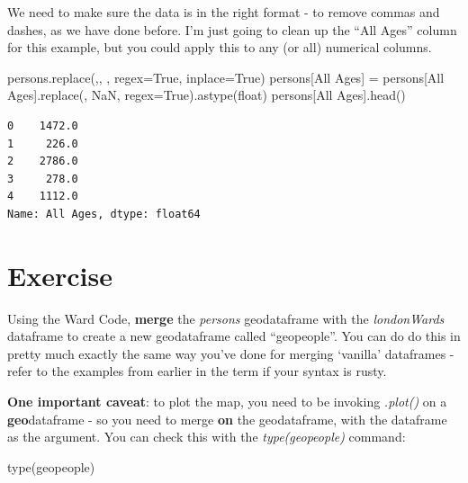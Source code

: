 \documentclass[
  letterpaper,
  DIV=11,
  numbers=noendperiod]{scrreprt}
\newenvironment{Shaded}{\begin{snugshade}}{\end{snugshade}}
\newcommand{\BuiltInTok}[1]{\textcolor[rgb]{0.00,0.23,0.31}{#1}}
\newcommand{\NormalTok}[1]{\textcolor[rgb]{0.00,0.23,0.31}{#1}}
\newcommand{\OperatorTok}[1]{\textcolor[rgb]{0.37,0.37,0.37}{#1}}
\newcommand{\StringTok}[1]{\textcolor[rgb]{0.13,0.47,0.30}{#1}}
\newcommand{\VariableTok}[1]{\textcolor[rgb]{0.07,0.07,0.07}{#1}}
\begin{document}
We need to make sure the data is in the right format - to remove commas
and dashes, as we have done before. I'm just going to clean up the ``All
Ages'' column for this example, but you could apply this to any (or all)
numerical columns.

\begin{Shaded}
\begin{Highlighting}[]
\NormalTok{persons.replace(}\StringTok{\textquotesingle{},\textquotesingle{}}\NormalTok{, }\StringTok{\textquotesingle{}\textquotesingle{}}\NormalTok{, regex}\OperatorTok{=}\VariableTok{True}\NormalTok{, inplace}\OperatorTok{=}\VariableTok{True}\NormalTok{)}
\NormalTok{persons[}\StringTok{\textquotesingle{}All Ages\textquotesingle{}}\NormalTok{] }\OperatorTok{=}\NormalTok{ persons[}\StringTok{\textquotesingle{}All Ages\textquotesingle{}}\NormalTok{].replace(}\StringTok{\textquotesingle{}{-}\textquotesingle{}}\NormalTok{, }\StringTok{\textquotesingle{}NaN\textquotesingle{}}\NormalTok{, regex}\OperatorTok{=}\VariableTok{True}\NormalTok{).astype(}\StringTok{\textquotesingle{}float\textquotesingle{}}\NormalTok{)}
\NormalTok{persons[}\StringTok{\textquotesingle{}All Ages\textquotesingle{}}\NormalTok{].head()}
\end{Highlighting}
\end{Shaded}

\begin{verbatim}
0    1472.0
1     226.0
2    2786.0
3     278.0
4    1112.0
Name: All Ages, dtype: float64
\end{verbatim}

\hypertarget{exercise-22}{%
\section{Exercise}\label{exercise-22}}

Using the Ward Code, \textbf{merge} the \emph{persons} geodataframe with
the \emph{londonWards} dataframe to create a new geodataframe called
``geopeople''. You can do do this in pretty much exactly the same way
you've done for merging `vanilla' dataframes - refer to the examples
from earlier in the term if your syntax is rusty.

\textbf{One important caveat}: to plot the map, you need to be invoking
\emph{.plot()} on a \textbf{geo}dataframe - so you need to merge
\textbf{on} the geodataframe, with the dataframe as the argument. You
can check this with the \emph{type(geopeople)} command:

\begin{Shaded}
\begin{Highlighting}[]
\BuiltInTok{type}\NormalTok{(geopeople)}
\end{Highlighting}
\end{Shaded}
\end{document}
